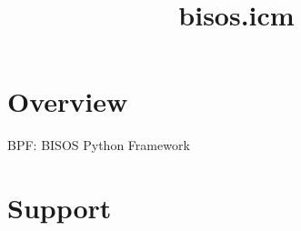 \documentclass{article}
\begin{document}

\begin{comment}
*  [[elisp:(org-cycle)][| ]]  *DBLK: front-begin*                                       :: [[elisp:(beginning-of-buffer)][Top]] [[elisp:(delete-other-windows)][(1)]]  [[elisp:(org-cycle)][| ]]
\end{comment}


\begin{comment}
*  [[elisp:(org-cycle)][| ]]  *DBLK: copyright*                                       :: [[elisp:(beginning-of-buffer)][Top]] [[elisp:(delete-other-windows)][(1)]]  [[elisp:(org-cycle)][| ]]
\end{comment}


\begin{comment}
*  [[elisp:(org-cycle)][| ]]  *DBLK: front-end*                                       :: [[elisp:(beginning-of-buffer)][Top]] [[elisp:(delete-other-windows)][(1)]]  [[elisp:(org-cycle)][| ]]
\end{comment}


\begin{comment}
*  [[elisp:(org-cycle)][| ]]  *DBLK: main-begin*                                       :: [[elisp:(beginning-of-buffer)][Top]] [[elisp:(delete-other-windows)][(1)]]  [[elisp:(org-cycle)][| ]]
\end{comment}

\title{bisos.icm}


\thispagestyle{empty}


\bigskip

\section{Overview}

BPF: BISOS Python Framework

\section{Support}
\end{document}
